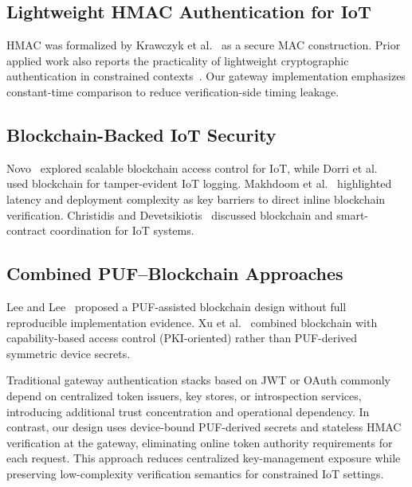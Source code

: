 \documentclass[conference]{IEEEtran}
\begin{document}
\subsection{Lightweight HMAC Authentication for IoT}

HMAC was formalized by Krawczyk et al.~\cite{rfc2104} as a secure MAC
construction. Prior applied work also reports the practicality of lightweight
cryptographic authentication in constrained contexts~\cite{bos2014differential}.
Our gateway implementation emphasizes constant-time comparison to reduce
verification-side timing leakage.

\subsection{Blockchain-Backed IoT Security}

Novo~\cite{novo2018blockchain} explored scalable blockchain access control for
IoT, while Dorri et al.~\cite{dorri2017blockchain} used blockchain for
tamper-evident IoT logging. Makhdoom et al.~\cite{makhdoom2019} highlighted
latency and deployment complexity as key barriers to direct inline blockchain
verification. Christidis and Devetsikiotis~\cite{christidis2016blockchains}
discussed blockchain and smart-contract coordination for IoT systems.

\subsection{Combined PUF--Blockchain Approaches}

Lee and Lee~\cite{lee2020puf} proposed a PUF-assisted blockchain design without
full reproducible implementation evidence. Xu et al.~\cite{xu2018blendcac}
combined blockchain with capability-based access control (PKI-oriented) rather
than PUF-derived symmetric device secrets.

Traditional gateway authentication stacks based on JWT or OAuth commonly depend
on centralized token issuers, key stores, or introspection services,
introducing additional trust concentration and operational dependency. In
contrast, our design uses device-bound PUF-derived secrets and stateless HMAC
verification at the gateway, eliminating online token authority requirements for
each request. This approach reduces centralized key-management exposure while
preserving low-complexity verification semantics for constrained IoT settings.
\end{document}
